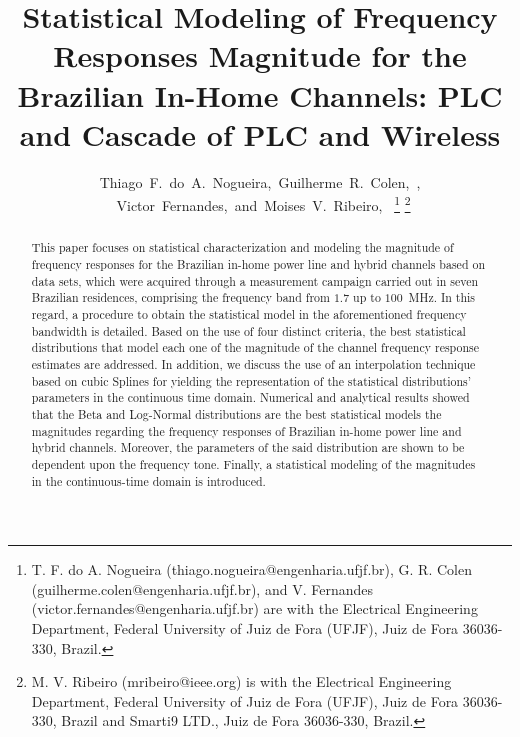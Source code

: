 \documentclass[journal]{IEEEtran}
\begin{document}
\title{Statistical Modeling of Frequency Responses Magnitude for the Brazilian In-Home Channels: PLC and Cascade of PLC and Wireless}

\author{Thiago~F.~do~A.~Nogueira,~Guilherme~R.~Colen,~,
	~Victor~Fernandes,~and~Moises~V.~Ribeiro,~
\thanks{T. F. do A. Nogueira (thiago.nogueira@engenharia.ufjf.br), G. R. Colen (guilherme.colen@engenharia.ufjf.br), and V. Fernandes (victor.fernandes@engenharia.ufjf.br) are with the Electrical Engineering Department, Federal University of Juiz	de Fora (UFJF), Juiz de Fora 36036-330, Brazil.}
\thanks{M. V. Ribeiro (mribeiro@ieee.org) is with the Electrical Engineering
	Department, Federal University of Juiz de Fora (UFJF), Juiz de Fora 36036-330, Brazil and Smarti9 LTD., Juiz de Fora 36036-330, Brazil.}}


\maketitle

\begin{abstract}
This paper focuses on statistical characterization and modeling the magnitude of frequency responses for the Brazilian in-home power line and hybrid channels based on data sets, which were acquired through a measurement campaign carried out in seven Brazilian residences, comprising the frequency band from $1.7$ up to $100$~MHz. In this regard, a procedure to obtain the statistical model in the aforementioned frequency bandwidth is detailed. Based on the use of four distinct criteria, the best statistical distributions that model each one of the magnitude of the channel frequency response estimates are addressed. In addition, we discuss the use of an interpolation technique based on cubic Splines for yielding the representation of the statistical distributions' parameters in the continuous time domain. Numerical and analytical results showed that the Beta and Log-Normal distributions are the best statistical models the magnitudes regarding the frequency responses of Brazilian in-home power line and hybrid channels. Moreover, the parameters of the said distribution are shown to be dependent upon the frequency tone. Finally, a statistical modeling of the magnitudes in the continuous-time domain is introduced.  

\end{abstract}
\end{document}
